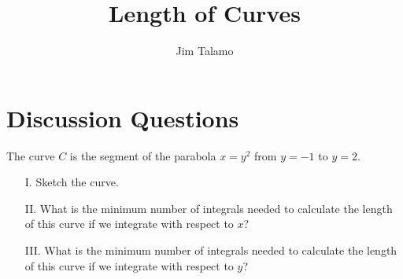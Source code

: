\documentclass[]{ximera}
\author{Jim Talamo}
\title[]{Length of Curves}
\begin{document}
\begin{abstract}
\end{abstract}
\maketitle

\vspace{-0.9in}

\section{Discussion Questions}

\begin{problem}
The curve $C$ is the segment of the parabola $x=y^2$ from $y=-1$ to $y=2$.  

\begin{enumerate}
\item[I.] Sketch the curve. 
\item[II.] What is the minimum number of integrals needed to calculate the length of this curve if we integrate with respect to $x$?  
\item[III.] What is the minimum number of integrals needed to calculate the length of this curve if we integrate with respect to $y$? 
\end{enumerate}
\end{problem}
\end{document}
